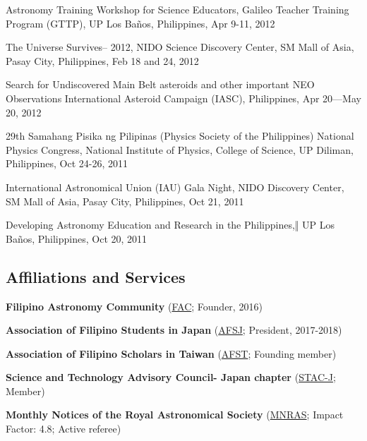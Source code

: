\documentclass[11pt,letterpaper]{article}
\begin{document}
\begin{list}{}{\cvlist}
    \item Astronomy Training Workshop for Science Educators, Galileo Teacher Training Program (GTTP), UP Los Baños, Philippines, Apr 9-11, 2012
    \item The Universe Survives– 2012, NIDO Science Discovery Center, SM Mall of Asia, Pasay City, Philippines, Feb 18 and 24, 2012
    \item Search for Undiscovered Main Belt asteroids and other important NEO Observations International Asteroid Campaign (IASC), Philippines, Apr 20—May 20, 2012
    \item 29th Samahang Pisika ng Pilipinas (Physics Society of the Philippines) National Physics Congress, National Institute of Physics, College of Science, UP Diliman, Philippines, Oct 24-26, 2011
    \item International Astronomical Union (IAU) Gala Night, NIDO Discovery Center, SM Mall of Asia, Pasay City, Philippines, Oct 21, 2011
    \item Developing Astronomy Education and Research in the Philippines,‖ UP Los Baños, Philippines, Oct 20, 2011
\end{list}

\subsection{Affiliations and Services}
\begin{list}{}{\cvlist}
    \item \textbf{Filipino Astronomy Community} (\href{https://www.facebook.com/groups/filastrocomm}{FAC}; Founder, 2016)
    \item \textbf{Association of Filipino Students in Japan} (\href{https://www.facebook.com/afsjpage}{AFSJ}; President, 2017-2018)
    \item \textbf{Association of Filipino Scholars in Taiwan} (\href{https://www.facebook.com/AssocIskolar}{AFST}; Founding member)
    \item \textbf{Science and Technology Advisory Council- Japan chapter} (\href{https://www.facebook.com/profile.php?id=100083271798519}{STAC-J}; Member)
    \item \textbf{Monthly Notices of the Royal Astronomical Society} (\href{https://academic.oup.com/mnras}{MNRAS}; Impact Factor: 4.8; Active referee)
\end{list}

\end{document}
